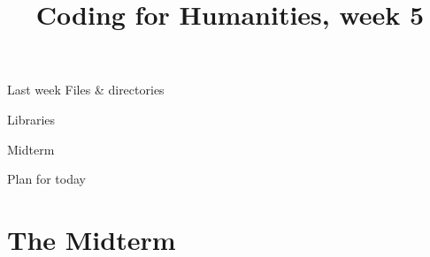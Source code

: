 \documentclass[aspectratio=169,usenames,dvipsnames]{beamer}
\title{Coding for Humanities, week 5}
\begin{document}
\begin{frame}
 \titlepage
\end{frame}

\begin{frame}{Last week}
    Files \& directories

    \vspace{1em}
    Libraries

    \vspace{1em}
    Midterm
\end{frame}

\begin{frame}{Plan for today}
 \tableofcontents
\end{frame}

\section{The Midterm}
\end{document}
